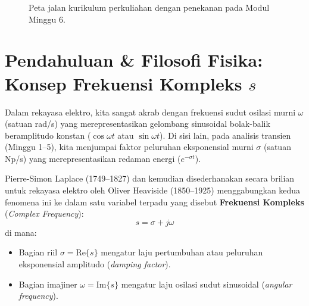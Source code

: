 \documentclass[11pt,a4paper]{article}
\theoremstyle{definition}
\begin{document}
\begin{figure}[htbp]
{%
}
\caption{Peta jalan kurikulum perkuliahan dengan penekanan pada Modul Minggu 6.}
\label{fig:peta_jalan_pd_w6}
\end{figure}

\section{Pendahuluan \& Filosofi Fisika: Konsep Frekuensi Kompleks \texorpdfstring{$s$}{s}}

Dalam rekayasa elektro, kita sangat akrab dengan frekuensi sudut osilasi murni $\omega$ (satuan rad/s) yang merepresentasikan gelombang sinusoidal bolak-balik beramplitudo konstan ($\cos\omega t$ atau $\sin\omega t$). Di sisi lain, pada analisis transien (Minggu 1--5), kita menjumpai faktor peluruhan eksponensial murni $\sigma$ (satuan Np/s) yang merepresentasikan redaman energi ($e^{-\sigma t}$).

Pierre-Simon Laplace (1749--1827) dan kemudian disederhanakan secara brilian untuk rekayasa elektro oleh Oliver Heaviside (1850--1925) menggabungkan kedua fenomena ini ke dalam satu variabel terpadu yang disebut \textbf{Frekuensi Kompleks} (\textit{Complex Frequency}):
\begin{equation}
    s = \sigma + j\omega
    \label{eq:complex_frequency}
\end{equation}
di mana:
\begin{itemize}[leftmargin=*]
    \item Bagian riil $\sigma = \text{Re}\{s\}$ mengatur laju pertumbuhan atau peluruhan eksponensial amplitudo (\textit{damping factor}).
    \item Bagian imajiner $\omega = \text{Im}\{s\}$ mengatur laju osilasi sudut sinusoidal (\textit{angular frequency}).
\end{itemize}
\end{document}
